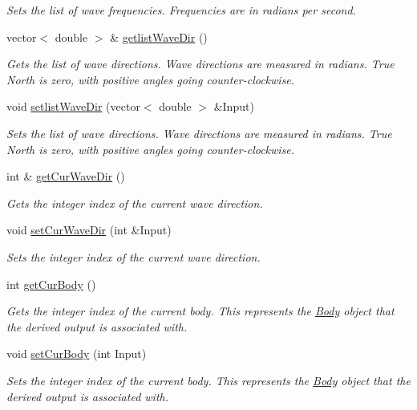 \begin{DoxyCompactItemize}
\begin{DoxyCompactList}\small\item\em Sets the list of wave frequencies. Frequencies are in radians per second. \end{DoxyCompactList}\item 
vector$<$ double $>$ \& \hyperlink{class_output_derived_ae52ca63f6ad9b7b99913fd071adda371}{getlist\-Wave\-Dir} ()
\begin{DoxyCompactList}\small\item\em Gets the list of wave directions. Wave directions are measured in radians. True North is zero, with positive angles going counter-\/clockwise. \end{DoxyCompactList}\item 
void \hyperlink{class_output_derived_ab809f8db22894f657c6b3256253395bf}{setlist\-Wave\-Dir} (vector$<$ double $>$ \&Input)
\begin{DoxyCompactList}\small\item\em Sets the list of wave directions. Wave directions are measured in radians. True North is zero, with positive angles going counter-\/clockwise. \end{DoxyCompactList}\item 
int \& \hyperlink{class_output_derived_ad59fff8dc8f1772039aff4950a3cdf18}{get\-Cur\-Wave\-Dir} ()
\begin{DoxyCompactList}\small\item\em Gets the integer index of the current wave direction. \end{DoxyCompactList}\item 
void \hyperlink{class_output_derived_a174188431586c269edca5f17db16b498}{set\-Cur\-Wave\-Dir} (int \&Input)
\begin{DoxyCompactList}\small\item\em Sets the integer index of the current wave direction. \end{DoxyCompactList}\item 
int \hyperlink{class_output_derived_ac3a9e37f0f7bc0ac003d2662db3d17bb}{get\-Cur\-Body} ()
\begin{DoxyCompactList}\small\item\em Gets the integer index of the current body. This represents the \hyperlink{class_body}{Body} object that the derived output is associated with. \end{DoxyCompactList}\item 
void \hyperlink{class_output_derived_a56aa87d4a9aec5e21842bf614920c1dc}{set\-Cur\-Body} (int Input)
\begin{DoxyCompactList}\small\item\em Sets the integer index of the current body. This represents the \hyperlink{class_body}{Body} object that the derived output is associated with. \end{DoxyCompactList}\end{DoxyCompactItemize}
